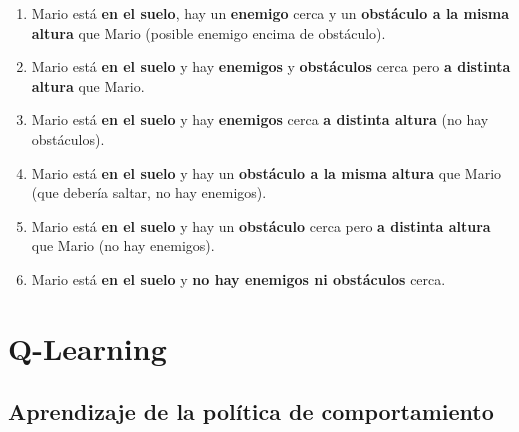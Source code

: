 \documentclass[10pt, spanish, pdftex]{../.template/template}
\begin{document}
\begin{enumerate}
                \item Mario está \textbf{en el suelo}, hay un \textbf{enemigo} cerca y un \textbf{obstáculo a la misma altura} que Mario (posible enemigo encima de obstáculo).
                \item Mario está \textbf{en el suelo} y hay \textbf{enemigos} y \textbf{obstáculos} cerca pero \textbf{a distinta altura} que Mario.
                \item Mario está \textbf{en el suelo} y hay \textbf{enemigos} cerca \textbf{a distinta altura} (no hay obstáculos).
                \item Mario está \textbf{en el suelo} y hay un \textbf{obstáculo a la misma altura} que Mario (que debería saltar, no hay enemigos).
                \item Mario está \textbf{en el suelo} y hay un \textbf{obstáculo} cerca pero \textbf{a distinta altura} que Mario (no hay enemigos).
                \item Mario está \textbf{en el suelo} y \textbf{no hay enemigos ni obstáculos} cerca.
        \end{enumerate}

\section{Q-Learning}\label{ql}
    
    \subsection{Aprendizaje de la política de comportamiento}
\end{document}
